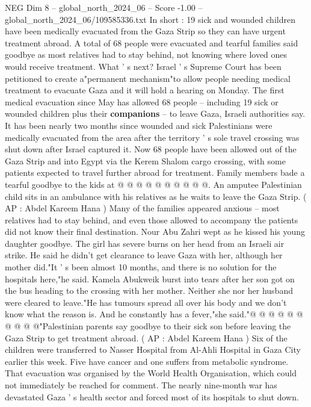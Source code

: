 \begin{textsample}{NEG Dim 8 – global\_north\_2024\_06 – Score -1.00 – global\_north\_2024\_06/109585336.txt}  \label{ex:f8_neg_392}
In short : 19 sick and wounded children have been medically evacuated from the Gaza Strip so they can have urgent treatment abroad.
A total of 68 people were evacuated and tearful families said goodbye as most relatives had to stay behind, not knowing where loved ones would receive treatment.
What ' s next?
Israel ' s Supreme Court has been petitioned to create a"permanent mechanism"to allow people needing medical treatment to evacuate Gaza and it will hold a hearing on Monday.
The first medical evacuation since May has allowed 68 people -- including 19 sick or wounded children plus their \textbf{companions} -- to leave Gaza, Israeli authorities say.
It has been nearly two months since wounded and sick Palestinians were medically evacuated from the area after the territory ' s sole travel crossing was shut down after Israel captured it.
Now 68 people have been allowed out of the Gaza Strip and into Egypt via the Kerem Shalom cargo crossing, with some patients expected to travel further abroad for treatment.
Family members bade a tearful goodbye to the kids at @ @ @ @ @ @ @ @ @ @.
An amputee Palestinian child sits in an ambulance with his relatives as he waits to leave the Gaza Strip. ( AP : Abdel Kareem Hana ) Many of the families appeared anxious -- most relatives had to stay behind, and even those allowed to accompany the patients did not know their final destination.
Nour Abu Zahri wept as he kissed his young daughter goodbye.
The girl has severe burns on her head from an Israeli air strike.
He said he didn't get clearance to leave Gaza with her, although her mother did."It ' s been almost 10 months, and there is no solution for the hospitals here,"he said.
Kamela Abukweik burst into tears after her son got on the bus heading to the crossing with her mother.
Neither she nor her husband were cleared to leave."He has tumours spread all over his body and we don't know what the reason is.
And he constantly has a fever,"she said."@ @ @ @ @ @ @ @ @ @"Palestinian parents say goodbye to their sick son before leaving the Gaza Strip to get treatment abroad. ( AP : Abdel Kareem Hana ) Six of the children were transferred to Nasser Hospital from Al-Ahli Hospital in Gaza City earlier this week.
Five have cancer and one suffers from metabolic syndrome.
That evacuation was organised by the World Health Organisation, which could not immediately be reached for comment.
The nearly nine-month war has devastated Gaza ' s health sector and forced most of its hospitals to shut down.

\end{textsample}
